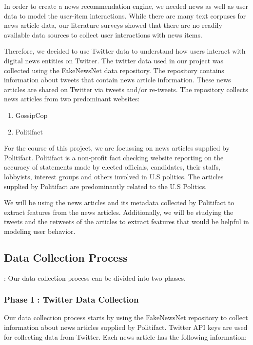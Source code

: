\documentclass{article}
\begin{document}
In order to create a news recommendation engine, we needed news as well as user data to model the user-item interactions. While there are many text corpuses for news article data, our literature surveys showed that there are no readily available data sources to collect user interactions with news items. 

Therefore, we decided to use Twitter data to understand how users interact with digital news entities on Twitter. 
The twitter data used in our project was collected using the FakeNewsNet data repository. The repository contains information about tweets that contain news article information. These news articles are shared on Twitter via tweets and/or re-tweets. The repository collects news articles from two predominant websites:
\begin{enumerate}
\item GossipCop
\item Politifact
\end{enumerate}

For the course of this project, we are focussing on news articles supplied by Politifact. Politifact is a non-profit fact checking website reporting on the accuracy of statements made by elected officials, candidates, their staffs, lobbyists, interest groups and others involved in U.S politics. The articles supplied by Politifact are predominantly related to the U.S Politics. 

We will be using the news articles and its metadata collected by Politifact to extract features from the news articles. Additionally, we will be studying the tweets and the retweets of the articles to extract features that would be helpful in modeling user behavior. \\

\subsection{Data Collection Process}:
Our data collection process can be divided into two phases.

\subsubsection{Phase I : Twitter Data Collection}
Our data collection process starts by using the FakeNewsNet repository to collect information about news articles supplied by Politifact. Twitter API keys are used for collecting data from Twitter.
Each news article has the following information:
\end{document}
